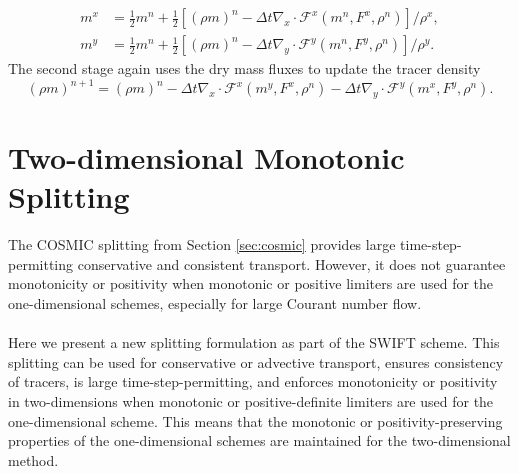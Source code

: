 \documentclass[11pt,a4paper]{article}
\begin{document}
\begin{subequations}
\begin{align}
    m^x &=\frac{1}{2}m^n + \frac{1}{2}\left[ (\rho m)^n - \Delta{t} \nabla_x\cdot \mathcal{F}^x(m^n,F^x,\rho^n)\right]/\rho^x, \\
    m^y &=\frac{1}{2}m^n + \frac{1}{2}\left[ (\rho m)^n - \Delta{t} \nabla_y\cdot \mathcal{F}^y(m^n,F^y,\rho^n)\right]/\rho^y.
\end{align}
\end{subequations}
The second stage again uses the dry mass fluxes to update the tracer density
\begin{equation} \label{eqn:skam_cosmic_tracer_end}
    (\rho m)^{n+1} = (\rho m)^{n} - \Delta{t} \nabla_x\cdot \mathcal{F}^x(m^y,F^x,\rho^n) - \Delta{t} \nabla_y\cdot \mathcal{F}^y(m^x,F^y,\rho^n).
\end{equation} %

\section{Two-dimensional Monotonic Splitting} \label{sec:swift_splitting} 

The COSMIC splitting from Section \ref{sec:cosmic} provides large time-step-permitting conservative and consistent transport. However, it does not guarantee monotonicity or positivity when monotonic or positive limiters are used for the one-dimensional schemes, especially for large Courant number flow. \\
\\
Here we present a new splitting formulation as part of the SWIFT scheme. This splitting can be used for conservative or advective transport, ensures consistency of tracers, is large time-step-permitting, and enforces monotonicity or positivity in two-dimensions when monotonic or positive-definite limiters are used for the one-dimensional scheme. This means that the monotonic or positivity-preserving properties of the one-dimensional schemes are maintained for the two-dimensional method. 
\end{document}
